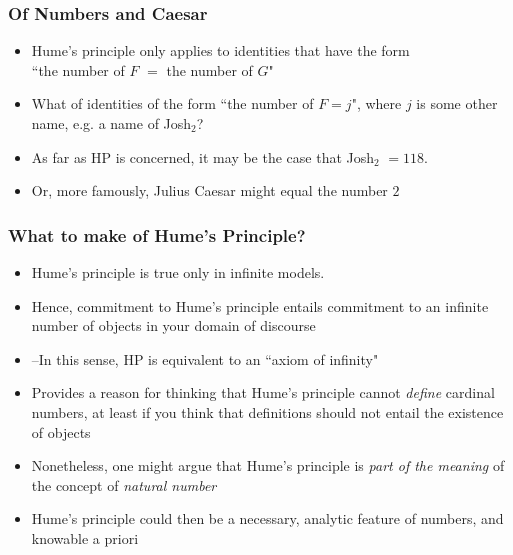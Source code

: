 \begin{frame}
\frametitle{Of Numbers and Caesar}

\begin{itemize}[<+->]

\item Hume's principle only applies to identities that have the form \\ ``the number of $F$ $=$ the number of $G$"

\item What of identities of the form ``the number of $F = j$", where $j$ is some other name, e.g. a name of Josh$_2$? 

\item As far as HP is concerned, it may be the case that Josh$_2$ $= 118$.  

\item Or, more famously, Julius Caesar might equal the number $2 $


\end{itemize}
\end{frame}


\begin{frame}
\frametitle{What to make of Hume's Principle?}

\begin{itemize}[<+->]

\item Hume's principle is true only in infinite models.

\item Hence, commitment to Hume's principle entails commitment to an infinite number of objects in your domain of discourse
\item[] --In this sense, HP is equivalent to an ``axiom of infinity"

\item Provides a reason for thinking that Hume's principle cannot \textit{define} cardinal numbers, at least if you think that definitions should not entail the existence of objects

\item Nonetheless, one might argue that Hume's principle is \textit{part of the meaning} of the concept of \textit{natural number}

\item Hume's principle could then be a necessary, analytic feature of numbers, and knowable a priori

\end{itemize}
\end{frame}




